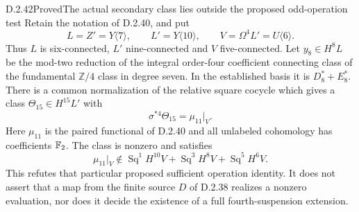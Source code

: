 \begin{claim}{D.2.42}{Proved}{The actual secondary class lies outside the proposed odd-operation test}
Retain the notation of D.2.40, and put
\[
 L=Z'=Y\langle7\rangle,\qquad
 L'=Y\langle10\rangle,\qquad V=\Omega^4L'=U\langle6\rangle.
 \tag{D.2.42a}
\]
Thus $L$ is six-connected, $L'$ nine-connected and $V$
five-connected.  Let $y_8\in H^8L$ be the mod-two reduction
of the integral order-four coefficient connecting class of
the fundamental $\mathbb Z/4$ class in degree seven.
In the established basis it is $D_8^*+E_8^*$.
There is a common normalization of the relative square cocycle
which gives a class $\Theta_{15}\in H^{15}L'$ with
\[
 \sigma^{*4}\Theta_{15}=\mu_{11}|_V.
 \tag{D.2.42b}
\]
Here $\mu_{11}$ is the paired functional of D.2.40 and all
unlabeled cohomology has coefficients $\mathbb F_2$.
The class is nonzero and satisfies
\[
 \mu_{11}|_V\notin
 \operatorname{Sq}^1H^{10}V+
 \operatorname{Sq}^3H^8V+
 \operatorname{Sq}^5H^6V.
 \tag{D.2.42c}
\]
This refutes that particular proposed sufficient operation
identity.  It does not assert that a map from the finite source
$D$ of D.2.38 realizes a nonzero evaluation, nor does it decide
the existence of a full fourth-suspension extension.
\end{claim}
